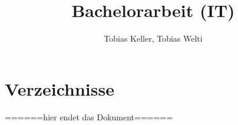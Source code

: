 %
%




\title{Bachelorarbeit (IT)}
\author{Tobias Keller, Tobias Welti}


% 

\setcounter{page}{1}
%


\tableofcontents
\newpage










\chapter{Verzeichnisse}\label{chap.verzeichnisse}
 
 \listoffigures
 \listoftables
 
 \lstlistoflistings



======hier endet das Dokument======




